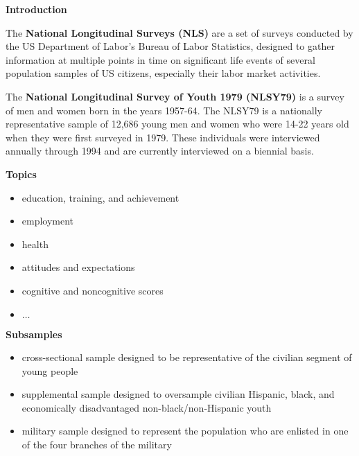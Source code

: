 \begin{frame}\begin{center}
    \LARGE\textbf{Introduction}
\end{center}\end{frame}
\begin{frame}
The \textbf{National Longitudinal Surveys (NLS)} are a set of surveys conducted by the US Department of Labor's Bureau of Labor Statistics, designed to gather information at multiple points in time on significant life events of several population samples of US citizens, especially their labor market activities.
\end{frame}
\begin{frame}
The \textbf{National Longitudinal Survey of Youth 1979 (NLSY79)} is a survey of men and women born in the years 1957-64. The NLSY79 is a nationally representative sample of 12,686 young men and women who were 14-22 years old when they were first surveyed in 1979. These individuals were interviewed annually through 1994 and are currently interviewed on a biennial basis.
\end{frame}
\begin{frame}\textbf{Topics}\vspace{0.3cm}
\begin{itemize}\setlength\itemsep{1em}
\item education, training, and achievement
\item employment
\item health
\item attitudes and expectations
\item cognitive and noncognitive scores
\item $\hdots$
\end{itemize}
\end{frame}
\begin{frame}\textbf{Subsamples}\vspace{0.3cm}
\begin{itemize}\setlength\itemsep{1em}
\item cross-sectional sample designed to be representative of the civilian segment of young people
\item supplemental sample designed to oversample civilian Hispanic, black, and economically disadvantaged non-black/non-Hispanic youth
\item military sample designed to represent the population who are enlisted in one of the four branches of the military
\end{itemize}
\end{frame}
